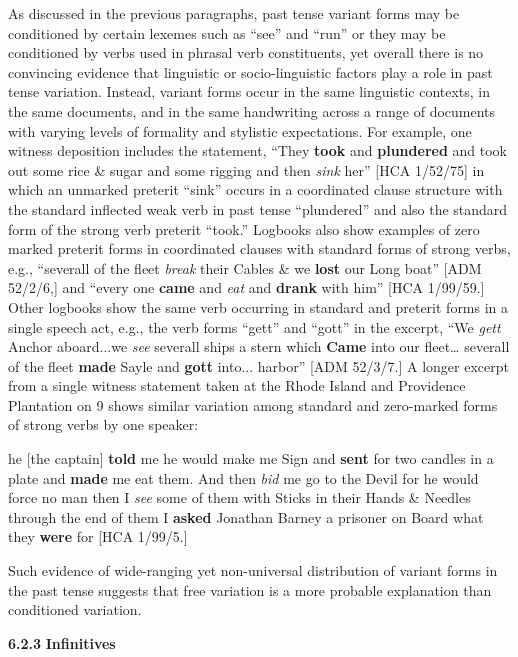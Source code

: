 As discussed in the previous paragraphs, past tense variant forms may be conditioned by certain lexemes such as “see” and “run” or they may be conditioned by verbs used in phrasal verb constituents, yet overall there is no convincing evidence that linguistic or socio-linguistic factors play a role in past tense variation. Instead, variant forms occur in the same linguistic contexts, in the same documents, and in the same handwriting across a range of documents with varying levels of formality and stylistic expectations. For example, one witness deposition includes the statement, “They \textbf{took} and \textbf{plundered} and took out some rice \& sugar and some rigging and then \textit{sink} her” [HCA 1/52/75] in which an unmarked preterit “sink” occurs in a coordinated clause structure with the standard inflected weak verb in past tense “plundered” and also the standard form of the strong verb preterit “took.” Logbooks also show examples of zero marked preterit forms in coordinated clauses with standard forms of strong verbs, e.g., “severall of the fleet \textit{break} their Cables \& we \textbf{lost} our Long boat” [ADM 52/2/6,] and “every one \textbf{came} and \textit{eat} and \textbf{drank} with him” [HCA 1/99/59.] Other logbooks show the same verb occurring in standard and preterit forms in a single speech act, e.g., the verb forms “gett” and “gott” in the excerpt, “We \textit{gett} Anchor aboard...we \textit{see} severall ships a stern which \textbf{Came} into our fleet… severall of the fleet \textbf{made} Sayle and \textbf{gott} into... harbor” [ADM 52/3/7.] A longer excerpt from a single witness statement taken at the Rhode Island and Providence Plantation on 9 \citealt{September1725} shows similar variation among standard and zero-marked forms of strong verbs by one speaker:

he [the captain] \textbf{told} me he would make me Sign and \textbf{sent} for two candles in a plate and \textbf{made} me eat them. And then \textit{bid} me go to the Devil for he would force no man then I \textit{see} some of them with Sticks in their Hands \& Needles through the end of them I \textbf{asked} Jonathan Barney a prisoner on Board what they \textbf{were} for [HCA 1/99/5.]

Such evidence of wide-ranging yet non-universal distribution of variant forms in the past tense suggests that free variation is a more probable explanation than conditioned variation.

  \textbf{6.2.3} \textbf{Infinitives}

